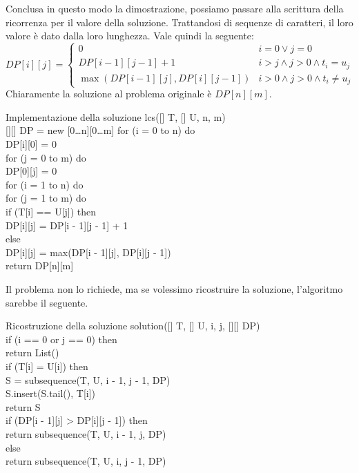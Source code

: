 Conclusa in questo modo la dimostrazione, possiamo passare alla scrittura
della ricorrenza per il valore della soluzione. Trattandosi di sequenze di
caratteri, il loro valore è dato dalla loro lunghezza. Vale quindi la seguente:
\[DP[i][j]=\begin{cases}
    0 & i=0 \vee j=0\\
    DP[i-1][j-1]+1 & i>j\wedge j>0\wedge t_i=u_j\\
    \max(DP[i-1][j], DP[i][j-1]) & i>0\wedge j>0\wedge t_i\neq u_j
\end{cases}\]
Chiaramente la soluzione al problema originale è $DP[n][m]$.

\begin{minicode}{Implementazione della soluzione}
\ind{} lcs([] T, [] U,  n,  m)\\
    [][] DP = new [0\dots n][0\dots m]\hfill{}
    \indf for (i = 0 to n) do\\
        DP[i][0] = 0\\
    \indf for (j = 0 to m) do\\
        DP[0][j] = 0\\
    \indf for (i = 1 to n) do\\
        \indff for (j = 1 to m) do\\
            \indfff if (T[i] == U[j]) then\\
                DP[i][j] = DP[i - 1][j - 1] + 1\\
            \indfff else\\
                DP[i][j] = max(DP[i - 1][j], DP[i][j - 1])\\
    \indf return DP[n][m]
\end{minicode}\noindent
Il problema non lo richiede, ma se volessimo ricostruire la soluzione,
l'algoritmo sarebbe il seguente.
\begin{minicode}{Ricostruzione della soluzione}
\ind{} solution([] T, [] U,  i,  j,
[][] DP)\\
    \indf if (i == 0 or j == 0) then\\
        return List()\\
    \indf if (T[i] = U[i]) then\\
         S = subsequence(T, U, i - 1, j - 1, DP)\\
        S.insert(S.tail(), T[i])\\
        return S\\
    \indf if (DP[i - 1][j] > DP[i][j - 1]) then\\
        return subsequence(T, U, i - 1, j, DP)\\
    \indf else\\
        return subsequence(T, U, i, j - 1, DP)\\
\end{minicode}
